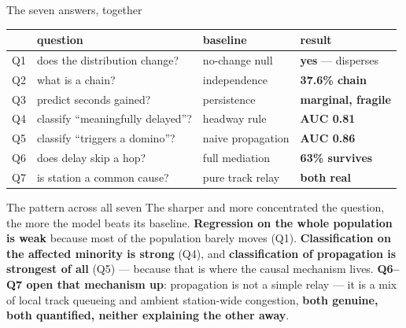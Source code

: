 \documentclass[aspectratio=169,10pt]{beamer}
\newcommand{\hl}[1]{{\color{corange}\textbf{#1}}}
\begin{document}
\begin{frame}{The seven answers, together}
  \centering\small
  \begin{tabular}{@{}p{0.6cm}p{4.6cm}p{3.4cm}p{2.7cm}@{}}
    \toprule
    & question & baseline & result \\
    \midrule
    Q1 & does the distribution change? & no-change null & \textbf{yes} --- disperses \\
    Q2 & what is a chain? & independence & \textbf{37.6\% chain} \\
    Q3 & predict seconds gained? & persistence & \hl{marginal, fragile} \\
    Q4 & classify ``meaningfully delayed''? & headway rule & \textbf{AUC 0.81} \\
    Q5 & classify ``triggers a domino''? & naive propagation & \textbf{AUC 0.86} \\
    Q6 & does delay skip a hop? & full mediation & \textbf{63\% survives} \\
    Q7 & is station a common cause? & pure track relay & \textbf{both real} \\
    \bottomrule
  \end{tabular}

  \vspace{1em}
  \raggedright
  \begin{block}{\small The pattern across all seven}
    \small The sharper and more concentrated the question, the more the model beats
    its baseline. \textbf{Regression on the whole population is weak}
    because most of the population barely moves (Q1). \textbf{Classification on the
    affected minority is strong} (Q4), and \textbf{classification of propagation is
    strongest of all} (Q5) --- because that is where the causal mechanism lives.
    \textbf{Q6--Q7 open that mechanism up}: propagation is not a simple relay ---
    it is a mix of local track queueing and ambient station-wide congestion,
    \hl{both genuine, both quantified, neither explaining the other away}.
  \end{block}
\end{frame}
\end{document}
